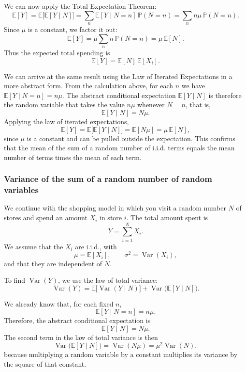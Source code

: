 We can now apply the Total Expectation Theorem:
\[
\mathbb{E}[Y]
=
\mathbb{E}\big[\mathbb{E}[Y \mid N]\big]
=
\sum_{n} \mathbb{E}[Y \mid N = n] \,\mathbb{P}(N = n)
=
\sum_{n} n \mu \,\mathbb{P}(N = n).
\]
Since \(\mu\) is a constant, we factor it out:
\[
\mathbb{E}[Y]
=
\mu \sum_{n} n \,\mathbb{P}(N = n)
=
\mu \,\mathbb{E}[N].
\]
Thus the expected total spending is
\[
\mathbb{E}[Y]
=
\mathbb{E}[N] \,\mathbb{E}[X_i].
\]

We can arrive at the same result using the Law of Iterated Expectations in a more abstract form.  
From the calculation above, for each \(n\) we have \(\mathbb{E}[Y \mid N = n] = n \mu\).  
The abstract conditional expectation \(\mathbb{E}[Y \mid N]\) is therefore the random variable that takes the value \(n \mu\) whenever \(N = n\), that is,
\[
\mathbb{E}[Y \mid N] = N \mu.
\]
Applying the law of iterated expectations,
\[
\mathbb{E}[Y]
=
\mathbb{E}\big[\mathbb{E}[Y \mid N]\big]
=
\mathbb{E}[N \mu]
=
\mu \,\mathbb{E}[N],
\]
since \(\mu\) is a constant and can be pulled outside the expectation.  
This confirms that the mean of the sum of a random number of i.i.d. terms equals the mean number of terms times the mean of each term.


\subsubsection{Variance of the sum of a random number of random variables}

We continue with the shopping model in which you visit a random number \(N\) of stores and spend an amount \(X_i\) in store \(i\).  
The total amount spent is
\[
Y = \sum_{i=1}^{N} X_i.
\]
We assume that the \(X_i\) are i.i.d., with
\[
\mu = \mathbb{E}[X_i],
\qquad
\sigma^{2} = \operatorname{Var}(X_i),
\]
and that they are independent of \(N\).

To find \(\operatorname{Var}(Y)\), we use the law of total variance:
\[
\operatorname{Var}(Y)
=
\mathbb{E}\big[\operatorname{Var}(Y \mid N)\big]
+
\operatorname{Var}\big(\mathbb{E}[Y \mid N]\big).
\]

We already know that, for each fixed \(n\),
\[
\mathbb{E}[Y \mid N = n]
=
n \mu.
\]
Therefore, the abstract conditional expectation is
\[
\mathbb{E}[Y \mid N] = N \mu.
\]
The second term in the law of total variance is then
\[
\operatorname{Var}\big(\mathbb{E}[Y \mid N]\big)
=
\operatorname{Var}(N \mu)
=
\mu^{2}\operatorname{Var}(N),
\]
because multiplying a random variable by a constant multiplies its variance by the square of that constant.

